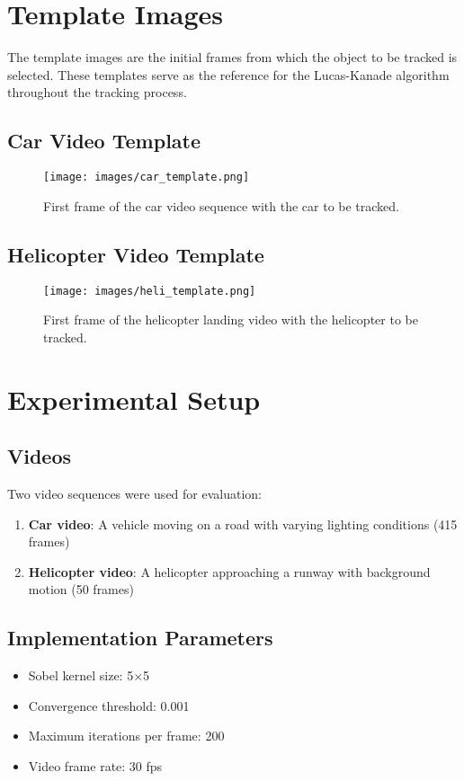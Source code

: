 \documentclass[12pt,a4paper]{article}
\begin{document}
\section{Template Images}

The template images are the initial frames from which the object to be tracked is selected. These templates serve as the reference for the Lucas-Kanade algorithm throughout the tracking process.

\subsection{Car Video Template}

\begin{figure}[H]
    \centering
    \texttt{[image: images/car\_template.png]}
    \caption{First frame of the car video sequence with the car to be tracked.}
    \label{fig:car_template}
\end{figure}

\subsection{Helicopter Video Template}

\begin{figure}[H]
    \centering
    \texttt{[image: images/heli\_template.png]}
    \caption{First frame of the helicopter landing video with the helicopter to be tracked.}
    \label{fig:heli_template}
\end{figure}

\section{Experimental Setup}

\subsection{Videos}
Two video sequences were used for evaluation:
\begin{enumerate}
\item \textbf{Car video}: A vehicle moving on a road with varying lighting conditions (415 frames)
\item \textbf{Helicopter video}: A helicopter approaching a runway with background motion (50 frames)
\end{enumerate}

\subsection{Implementation Parameters}
\begin{itemize}
\item Sobel kernel size: 5×5
\item Convergence threshold: 0.001
\item Maximum iterations per frame: 200
\item Video frame rate: 30 fps
\end{itemize}
\end{document}
